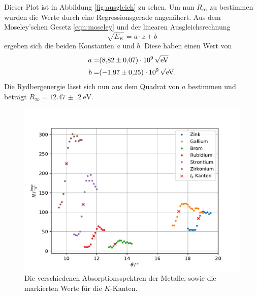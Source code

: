 Dieser Plot ist in Abbildung \ref{fig:ausgleich} zu sehen.
Um nun $R_\infty$ zu bestimmen wurden die Werte durch eine Regressionsgerade angenähert.
Aus dem Moseley'schen Gesetz \eqref{eqn:moseley} und der linearen Ausgleichsrechnung
\begin{equation*}
    \sqrt{E_K} = a \cdot z + b
\end{equation*}
ergeben sich die beiden Konstanten $a$ und $b$.
Diese haben einen Wert von 
\begin{align*}
  a =& \SI{8.82(7)e9}{\sqrt{\eV}}\\
  b=& \SI{-1.97(25)e9}{\sqrt{\eV}}.\\
\end{align*}
Die Rydbergenergie lässt sich nun aus dem Quadrat von $a$ bestimmen und beträgt $R_\infty = \SI{12.47(20)}{\eV}$.


\begin{figure}
  \centering
  \includegraphics[width=\textwidth]{content/data/verschmetalle.pdf}
  \caption{Die verschiedenen Absorptionsspektren der Metalle, sowie die markierten Werte für die $K$-Kanten.}
  \label{fig:versch}
\end{figure}

